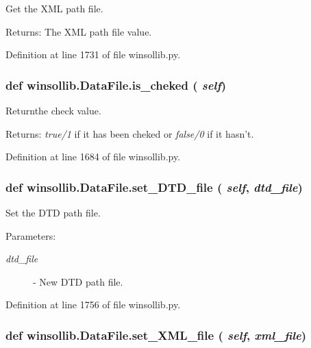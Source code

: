 Get the XML path file. 

\begin{Desc}
\item[Returns:]The XML path file value. \end{Desc}


Definition at line 1731 of file winsollib.py.\hypertarget{classwinsollib_1_1DataFile_71feb0933f381bb2dc77115bbd3114ca}{
\subsubsection[is\_\-cheked]{\setlength{\rightskip}{0pt plus 5cm}def winsollib.Data\-File.is\_\-cheked ( {\em self})}}
\label{classwinsollib_1_1DataFile_71feb0933f381bb2dc77115bbd3114ca}


Returnthe check value. 

\begin{Desc}
\item[Returns:]{\em true/1\/} if it has been cheked or {\em false/0\/} if it hasn't. \end{Desc}


Definition at line 1684 of file winsollib.py.\hypertarget{classwinsollib_1_1DataFile_9942934eecb74d9bed46a9be94141418}{
\subsubsection[set\_\-DTD\_\-file]{\setlength{\rightskip}{0pt plus 5cm}def winsollib.Data\-File.set\_\-DTD\_\-file ( {\em self},  {\em dtd\_\-file})}}
\label{classwinsollib_1_1DataFile_9942934eecb74d9bed46a9be94141418}


Set the DTD path file. 

\begin{Desc}
\item[Parameters:]
\begin{description}
\item[{\em dtd\_\-file}]- New DTD path file. \end{description}
\end{Desc}


Definition at line 1756 of file winsollib.py.\hypertarget{classwinsollib_1_1DataFile_8b0dbebbb0dff05ac6afdadc68584bcb}{
\subsubsection[set\_\-XML\_\-file]{\setlength{\rightskip}{0pt plus 5cm}def winsollib.Data\-File.set\_\-XML\_\-file ( {\em self},  {\em xml\_\-file})}}
\label{classwinsollib_1_1DataFile_8b0dbebbb0dff05ac6afdadc68584bcb}


